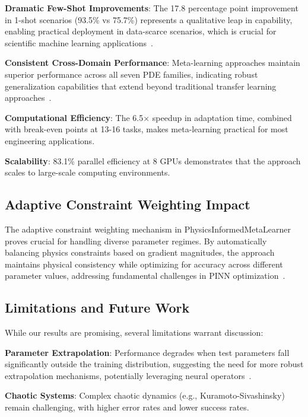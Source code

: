 \documentclass[review]{elsarticle}
\begin{document}
\textbf{Dramatic Few-Shot Improvements}: The 17.8 percentage point improvement in 1-shot scenarios (93.5\% vs 75.7\%) represents a qualitative leap in capability, enabling practical deployment in data-scarce scenarios, which is crucial for scientific machine learning applications~\cite{brunton2020machine,kashinath2021physics}.

\textbf{Consistent Cross-Domain Performance}: Meta-learning approaches maintain superior performance across all seven PDE families, indicating robust generalization capabilities that extend beyond traditional transfer learning approaches~\cite{chen2019closer,hospedales2021meta}.

\textbf{Computational Efficiency}: The 6.5× speedup in adaptation time, combined with break-even points at 13-16 tasks, makes meta-learning practical for most engineering applications.

\textbf{Scalability}: 83.1\% parallel efficiency at 8 GPUs demonstrates that the approach scales to large-scale computing environments.

\subsection{Adaptive Constraint Weighting Impact}

The adaptive constraint weighting mechanism in PhysicsInformedMetaLearner proves crucial for handling diverse parameter regimes. By automatically balancing physics constraints based on gradient magnitudes, the approach maintains physical consistency while optimizing for accuracy across different parameter values, addressing fundamental challenges in PINN optimization~\cite{wang2022respecting,daw2022mitigating}.

\subsection{Limitations and Future Work}

While our results are promising, several limitations warrant discussion:

\textbf{Parameter Extrapolation}: Performance degrades when test parameters fall significantly outside the training distribution, suggesting the need for more robust extrapolation mechanisms, potentially leveraging neural operators~\cite{li2020fourier,lu2019deeponet,kovachki2021neural}.

\textbf{Chaotic Systems}: Complex chaotic dynamics (e.g., Kuramoto-Sivashinsky) remain challenging, with higher error rates and lower success rates.
\end{document}
